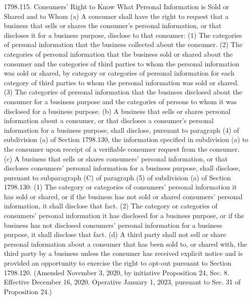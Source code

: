 1798.115.  Consumers’ Right to Know What Personal Information is Sold or Shared and to Whom
(a) A consumer shall have the right to request that a business that sells or shares the consumer’s personal information, or that discloses it for a business purpose, disclose to that consumer:
(1) The categories of personal information that the business collected about the consumer.
(2) The categories of personal information that the business sold or shared about the consumer and the categories of third parties to whom the personal information was sold or shared, by category or categories of personal information for each category of third parties to whom the personal information was sold or shared.
(3) The categories of personal information that the business disclosed about the consumer for a business purpose and the categories of persons to whom it was disclosed for a business purpose.
(b) A business that sells or shares personal information about a consumer, or that discloses a consumer’s personal information for a business purpose, shall disclose, pursuant to paragraph (4) of subdivision (a) of Section 1798.130, the information specified in subdivision (a) to the consumer upon receipt of a verifiable consumer request from the consumer.
(c) A business that sells or shares consumers’ personal information, or that discloses consumers’ personal information for a business purpose, shall disclose, pursuant to subparagraph (C) of paragraph (5) of subdivision (a) of Section 1798.130:
(1) The category or categories of consumers’ personal information it has sold or shared, or if the business has not sold or shared consumers’ personal information, it shall disclose that fact.
(2) The category or categories of consumers’ personal information it has disclosed for a business purpose, or if the business has not disclosed consumers’ personal information for a business purpose, it shall disclose that fact.
(d) A third party shall not sell or share personal information about a consumer that has been sold to, or shared with, the third party by a business unless the consumer has received explicit notice and is provided an opportunity to exercise the right to opt-out pursuant to Section 1798.120.
(Amended November 3, 2020, by initiative Proposition 24, Sec. 8. Effective December 16, 2020. Operative January 1, 2023, pursuant to Sec. 31 of Proposition 24.)

